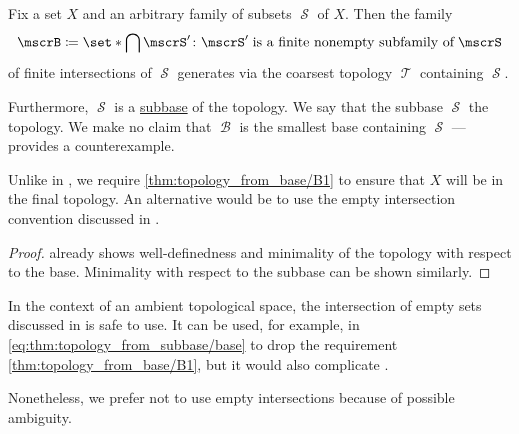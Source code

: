 \begin{proposition}\label{thm:topology_from_subbase}
  Fix a set \( X \) and an arbitrary family of subsets \( \mscrS \) of \( X \). Then the family
  \begin{equation}\label{eq:thm:topology_from_subbase/base}
    \mscrB \coloneqq \set*{ \bigcap \mscrS' \colon \mscrS' \T{is a finite nonempty subfamily of} \mscrS }
  \end{equation}
  of finite intersections of \( \mscrS \) generates via  the coarsest topology \( \mscrT \) containing \( \mscrS \).

  Furthermore, \( \mscrS \) is a \hyperref[def:topological_subbase]{subbase} of the topology. We say that the subbase \( \mscrS \)  the topology. We make no claim that \( \mscrB \) is the smallest base containing \( \mscrS \) ---  provides a counterexample.

  Unlike in , we require \ref{thm:topology_from_base/B1} to ensure that \( X \) will be in the final topology. An alternative would be to use the empty intersection convention discussed in .
\end{proposition}
\begin{proof}
   already shows well-definedness and minimality of the topology with respect to the base. Minimality with respect to the subbase can be shown similarly.
\end{proof}

\begin{remark}\label{rem:subbase_and_empty_intersection}
  In the context of an ambient topological space, the intersection of empty sets discussed in  is safe to use. It can be used, for example, in \eqref{eq:thm:topology_from_subbase/base} to drop the requirement \ref{thm:topology_from_base/B1}, but it would also complicate .

  Nonetheless, we prefer not to use empty intersections because of possible ambiguity.
\end{remark}

